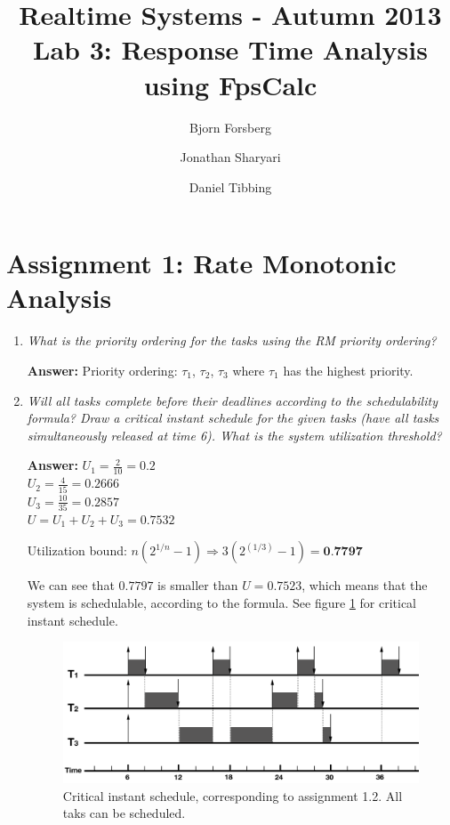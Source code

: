 \documentclass[a4paper,10pt]{article}
\title{Realtime Systems - Autumn 2013 \\ \textbf{Lab 3: Response Time Analysis using FpsCalc}}
\author{Bjorn Forsberg \and Jonathan Sharyari \and Daniel Tibbing}
\newcommand{\answer}{\textbf{Answer: }}
\begin{document}
\maketitle

\section{Assignment 1: Rate Monotonic Analysis}

\begin{enumerate}
	\item \emph{What is the priority ordering for the tasks using the RM priority ordering?}
	
	\answer Priority ordering: $\tau_1$, $\tau_2$, $\tau_3$ where $\tau_1$ has the highest priority.
	
	\item \emph{Will all tasks complete before their deadlines according to the schedulability formula? Draw a critical instant schedule for the given tasks (have all tasks simultaneously released at time 6). What is the system utilization threshold?}
	
	\answer $U_1 = \frac{2}{10} = 0.2$ \\
	$U_2 = \frac{4}{15} = 0.2666$ \\
	$U_3 = \frac{10}{35} = 0.2857$ \\
	$U = U_1 + U_2 + U_3 = 0.7532$
	
	Utilization bound: $n(2^{1/n} - 1) \Rightarrow 3(2^(1/3) - 1) = \textbf{0.7797}$
	
	We can see that $0.7797$ is smaller than $U = 0.7523$, which means that the system is schedulable, according to the formula. See figure \ref{1_2} for critical instant schedule.
	
	\begin{figure}
	\includegraphics[scale=0.4]{1_2}
	\caption{Critical instant schedule, corresponding to assignment 1.2. All taks can be scheduled.}
	\label{1_2}
	\end{figure}
	

\end{enumerate}
\end{document}
